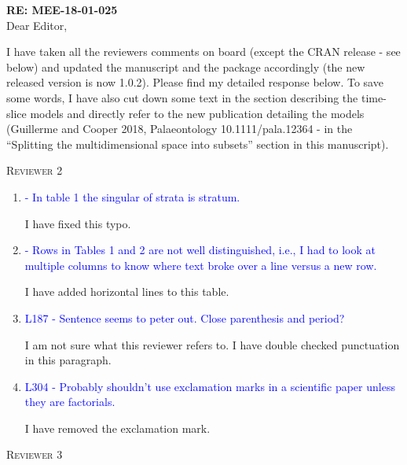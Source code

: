 \documentclass[12pt,letterpaper]{article}
\renewcommand{\section}[1]{%
\bigskip
\begin{center}
\begin{Large}
\normalfont\scshape #1
\medskip
\end{Large}
\end{center}}
\begin{document}
\textbf{RE: MEE-18-01-025}\\
\bigskip
Dear Editor,\\
\bigskip

I have taken all the reviewers comments on board (except the CRAN release - see below) and updated the manuscript and the package accordingly (the new released version is now 1.0.2).
Please find my detailed response below.
To save some words, I have also cut down some text in the section describing the time-slice models and directly refer to the new publication detailing the models (Guillerme and Cooper 2018, Palaeontology 10.1111/pala.12364 - in the ``Splitting the multidimensional space into subsets'' section in this manuscript).
%
%


\section{Reviewer 2}

\begin{enumerate}

\item{\textcolor{blue}{- In table 1 the singular of strata is stratum.}}

I have fixed this typo.

\item{\textcolor{blue}{- Rows in Tables 1 and 2 are not well distinguished, i.e., I had to look at multiple columns to know where text broke over a line versus a new row.}}

I have added horizontal lines to this table.

\item{\textcolor{blue}{L187 - Sentence seems to peter out. Close parenthesis and period?}}

I am not sure what this reviewer refers to.
I have double checked punctuation in this paragraph.

\item{\textcolor{blue}{L304 - Probably shouldn't use exclamation marks in a scientific paper unless they are factorials.}}

I have removed the exclamation mark.

\end{enumerate}


\section{Reviewer 3}
\end{document}
